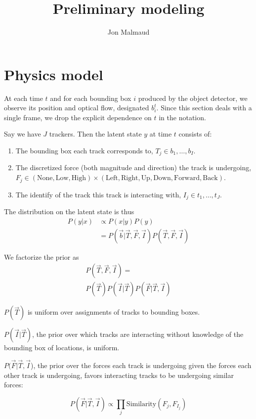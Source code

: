 \documentclass{article}
\author{Jon Malmaud}
\title{Preliminary modeling}
\begin{document}
  \maketitle
\section{Physics model}
At each time $t$ and for each bounding box $i$ produced by the object detector, we observe its position and optical flow, designated $b^t_i$. Since this section deals with a single frame, we drop the explicit dependence on $t$ in the notation.

Say we have $J$ trackers. Then the latent state $y$ at time $t$ consists of:

\begin{enumerate}
 \item The bounding box each track corresponds to, $T_j \in {b_1,\ldots,b_I}$.
 \item The discretized force (both magnitude and direction) the track is undergoing, $F_j \in {(\text{None}, \text{Low}, \text{High})} \times (\text{Left},\text{Right},\text{Up},\text{Down},\text{Forward},\text{Back})$.
 \item The identify of the track this track is interacting with, $I_j \in {t_1,\ldots,t_J}$.
\end{enumerate}

The distribution on the latent state is thus
\begin{align}
  P(y|x)&\propto P(x|y)P(y)\\
  &=P(\vec{b}|\vec{T}, \vec{F}, \vec{I})P(\vec{T},\vec{F},\vec{I})
\end{align}

We factorize the prior as
\begin{gather}
  P(\vec{T}, \vec{F}, \vec{I})=\\
  P(\vec{T})P(\vec{I}|\vec{T})P(\vec{F}|\vec{T},\vec{I})
\end{gather}

$P(\vec{T})$ is uniform over assignments of tracks to bounding boxes.

$P(\vec{I}|\vec{T})$, the prior over which tracks are interacting without knowledge of the bounding box of locations, is uniform.

$P(\vec{F}|\vec{T},\vec{I}$), the prior over the forces each track is undergoing given the forces each other track is undergoing, favors interacting tracks to be undergoing similar forces:

\begin{equation}
  P(\vec{F}|\vec{T},\vec{I})\propto \prod_j \text{Similarity}(F_j, F_{I_j})
\end{equation}
\end{document}
